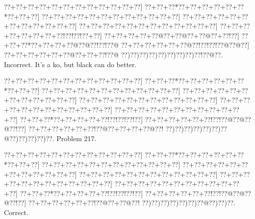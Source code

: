 \documentclass[a5paper]{article}
\begin{document}
\begin{center}
{\goo
\0??+\0??+\0??+\0??+\0??+\0??+\0??+\0??+\0??+\0??+\0??+\0??]
\0??+\0??+\0??*\0??+\0??+\0??+\0??+\0??+\0??*\0??+\0??+\0??]
\0??+\0??+\0??+\0??+\0??+\0??+\0??+\0??+\0??+\0??+\0??+\0??]
\0??+\0??+\0??+\0??+\0??+\0??+\0??+\0??+\0??+\0??+\0??+\0??]
\0??+\0??+\0??+\0??+\0??+\0??+\0??+\0??+\0??+\0??+\0??+\0??]
\0??+\0??+\0??+\0??+\0??+\0??+\0??+\0??!\0??!\0??!\0??+\0??]
\0??+\0??+\0??+\0??+\0??@\0??+\0??@\0??+\0??@\0??+\0??!\0??]
\0??+\0??+\0??*\0??+\0??+\0??+\0??@\0??@\0??!\0??!\0??@
\0??+\0??+\0??+\0??+\0??+\0??@\0??!\0??!\0??!\0??@\0??@\0??]
\0??+\0??+\0??+\0??+\0??+\0??@\0??+\0??+\0??!\0??@
\0??)\0??)\0??)\0??)\0??)\0??)\0??)\0??)\0??!\0??@\0??.
}
Incorrect. It's a ko, but black can do better. 

\end{center}
\newpage
\begin{center}
{\goo
\0??+\0??+\0??+\0??+\0??+\0??+\0??+\0??+\0??+\0??+\0??+\0??]
\0??+\0??+\0??*\0??+\0??+\0??+\0??+\0??+\0??*\0??+\0??+\0??]
\0??+\0??+\0??+\0??+\0??+\0??+\0??+\0??+\0??+\0??+\0??+\0??]
\0??+\0??+\0??+\0??+\0??+\0??+\0??+\0??+\0??+\0??+\0??+\0??]
\0??+\0??+\0??+\0??+\0??+\0??+\0??+\0??+\0??+\0??+\0??+\0??]
\0??+\0??+\0??+\0??+\0??+\0??+\0??+\0??+\0??+\0??+\0??+\0??]
\0??+\0??+\0??+\0??+\0??+\0??+\0??+\0??+\0??+\0??+\0??+\0??]
\0??+\0??+\0??*\0??+\0??+\0??+\0??+\0??!\0??!\0??!\0??!\0??]
\0??+\0??+\0??+\0??+\0??+\0??!\0??!\0??@\0??@\0??@\0??!\0??]
\0??+\0??+\0??+\0??+\0??+\0??!\0??@\0??+\0??+\0??+\0??@\0??!
\0??)\0??)\0??)\0??)\0??)\0??)\0??@\0??)\0??)\0??)\0??)\0??.
}
Problem 217.

\end{center}
\begin{center}
{\goo
\0??+\0??+\0??+\0??+\0??+\0??+\0??+\0??+\0??+\0??+\0??+\0??]
\0??+\0??+\0??*\0??+\0??+\0??+\0??+\0??+\0??*\0??+\0??+\0??]
\0??+\0??+\0??+\0??+\0??+\0??+\0??+\0??+\0??+\0??+\0??+\0??]
\0??+\0??+\0??+\0??+\0??+\0??+\0??+\0??+\0??+\0??+\0??+\0??]
\0??+\0??+\0??+\0??+\0??+\0??+\0??+\0??+\0??+\0??+\0??+\0??]
\0??+\0??+\0??+\0??+\0??+\0??+\0??+\0??+\0??+\0??+\0??+\0??]
\0??+\0??+\0??+\0??+\0??+\0??+\0??+\0??+\0??+\0??+\0??+\0??]
\0??+\0??+\0??*\0??+\0??+\0??+\0??+\0??!\0??!\0??!\0??!\0??]
\0??+\0??+\0??+\0??+\0??+\0??!\0??!\0??@\0??@\0??@\0??!\0??]
\0??+\0??+\0??+\0??+\0??+\0??!\0??@\0??+\0??@\0??!
\0??)\0??)\0??)\0??)\0??)\0??)\0??@\0??)\0??)\0??.
}
Correct. 

\end{center}
\end{document}
